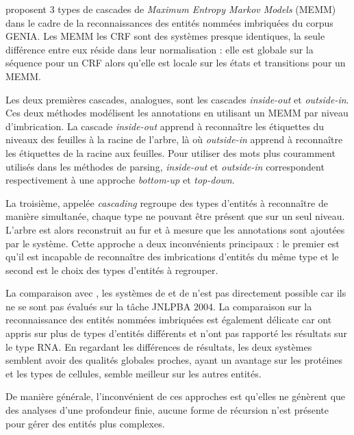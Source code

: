 \documentclass[12pt,a4paper,times,twoside,openright]{report}
\begin{document}
\citet{alex2007recognising} proposent 3 types de cascades de \textit{Maximum Entropy Markov Models} (MEMM) dans le cadre de la reconnaissances des entités nommées imbriquées du corpus GENIA. Les MEMM les CRF sont des systèmes presque identiques, la seule différence entre eux réside dans leur normalisation : elle est globale sur la séquence pour un CRF alors qu'elle est locale sur les états et transitions pour un MEMM.

Les deux premières cascades, analogues, sont les cascades \textit{inside-out} et \textit{outside-in}. Ces deux méthodes modélisent les annotations en utilisant un MEMM par niveau d'imbrication. La cascade \textit{inside-out} apprend à reconnaître les étiquettes du niveaux des feuilles à la racine de l'arbre, là où \textit{outside-in} apprend à reconnaître les étiquettes de la racine aux feuilles. Pour utiliser des mots plus couramment utilisés dans les méthodes de parsing, \textit{inside-out} et \textit{outside-in} correspondent respectivement à une approche \textit{bottom-up} et \textit{top-down}.

La troisième, appelée \textit{cascading} regroupe des types d'entités à reconnaître de manière simultanée, chaque type ne pouvant être présent que sur un seul niveau. L'arbre est alors reconstruit au fur et à mesure que les annotations sont ajoutées par le système. Cette approche a deux inconvénients principaux : le premier est qu'il est incapable de reconnaître des imbrications d'entités du même type et le second est le choix des types d'entités à regrouper.

La comparaison avec \citet{alex2007recognising}, les systèmes de \citet{finkel2009b} et de \citet{guodong2004exploring} n'est pas directement possible car ils ne se sont pas évalués sur la tâche JNLPBA 2004. La comparaison sur la reconnaissance des entités nommées imbriquées est également délicate car \citet{alex2007recognising} ont appris sur plus de types d'entités différents et n'ont pas rapporté les résultats sur le type RNA. En regardant les différences de résultats, les deux systèmes semblent avoir des qualités globales proches, \citet{alex2007recognising} ayant un avantage sur les protéines et les types de cellules, \citet{finkel2009b} semble meilleur sur les autres entités.

De manière générale, l'inconvénient de ces approches est qu'elles ne génèrent que des analyses d'une profondeur finie, aucune forme de récursion n'est présente pour gérer des entités plus complexes.
\end{document}
